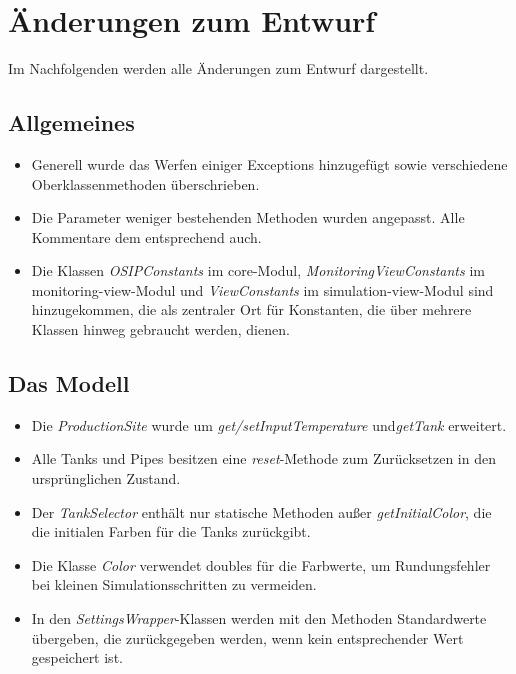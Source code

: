 \documentclass[parskip=full]{scrartcl}
\begin{document}
\section{Änderungen zum Entwurf}
Im Nachfolgenden werden alle Änderungen zum Entwurf dargestellt.

\subsection{Allgemeines}
\begin{itemize}
 \item Generell wurde das Werfen einiger Exceptions hinzugefügt sowie verschiedene Oberklassenmethoden überschrieben.
 \item Die Parameter weniger bestehenden Methoden wurden angepasst. Alle Kommentare dem entsprechend auch.
 \item Die Klassen \emph{OSIPConstants} im core-Modul, \emph{MonitoringViewConstants} im monitoring-view-Modul und \emph{ViewConstants} im simulation-view-Modul sind hinzugekommen, die als zentraler Ort für Konstanten, die über mehrere Klassen hinweg gebraucht werden, dienen.
\end{itemize}

\subsection{Das Modell}
\begin{itemize}
 \item Die \emph{ProductionSite} wurde um \emph{get/setInputTemperature} und\emph{getTank} erweitert.
 \item Alle Tanks und Pipes besitzen eine \emph{reset}-Methode zum Zurücksetzen in den ursprünglichen Zustand.
 \item Der \emph{TankSelector} enthält nur statische Methoden außer \emph{getInitialColor}, die die initialen Farben für die Tanks zurückgibt.
 \item Die Klasse \emph{Color} verwendet doubles für die Farbwerte, um Rundungsfehler bei kleinen Simulationsschritten zu vermeiden.
 \item In den \emph{SettingsWrapper}-Klassen werden mit den Methoden Standardwerte übergeben, die zurückgegeben werden, wenn kein entsprechender Wert gespeichert ist.
\end{itemize}
\end{document}
